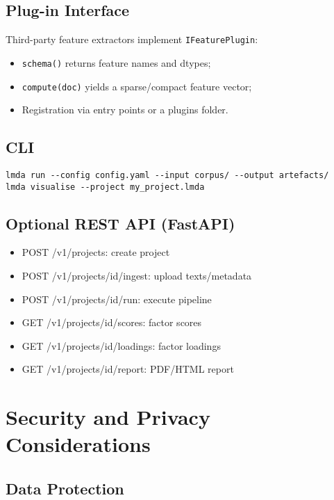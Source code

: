 \subsection{Plug-in Interface}

Third-party feature extractors implement \texttt{IFeaturePlugin}:
\begin{itemize}
    \item \texttt{schema()} returns feature names and dtypes;
    \item \texttt{compute(doc)} yields a sparse/compact feature vector;
    \item Registration via entry points or a plugins folder.
\end{itemize}

\subsection{CLI}

\begin{verbatim}
lmda run --config config.yaml --input corpus/ --output artefacts/
lmda visualise --project my_project.lmda
\end{verbatim}

\subsection{Optional REST API (FastAPI)}

\begin{itemize}
    \item POST /v1/projects: create project
    \item POST /v1/projects/{id}/ingest: upload texts/metadata
    \item POST /v1/projects/{id}/run: execute pipeline
    \item GET /v1/projects/{id}/scores: factor scores
    \item GET /v1/projects/{id}/loadings: factor loadings
    \item GET /v1/projects/{id}/report: PDF/HTML report
\end{itemize}

\section{Security and Privacy Considerations}

\subsection{Data Protection}

